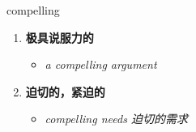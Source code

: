 
\begin{frame}
{\huge compelling}
\begin{center}
\begin{enumerate}\Large
  \item \textbf{极具说服力的}
  \begin{itemize}
    \item \em{\Large{a compelling argument}}
  \end{itemize}
  \item \textbf{迫切的，紧迫的}
  \begin{itemize}
    \item \em{\Large{compelling needs 迫切的需求}}
  \end{itemize}
\end{enumerate}
\end{center}
\end{frame}
